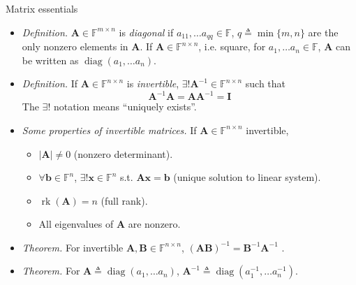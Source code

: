 \documentclass{beamer}
\numberwithin{equation}{section}
\begin{document}
\begin{frame}{Matrix essentials}
    \begin{itemize}
        \item
        \textit{Definition.} $ \mathbf{A} \in \mathbb{F}^{m \times n} $
        is \textit{diagonal} if $ a_{11}, \ldots a_{qq}  \in \mathbb{F} $,
        $ q \triangleq \min\{m, n\} $ are the only nonzero elements in
        $ \mathbf{A} $. If $ \mathbf{A} \in \mathbb{F}^{n \times n} $, i.e.
        square, for $ a_1, \ldots a_n \in \mathbb{F} $, $ \mathbf{A} $ can
        be written as $ \operatorname{diag}(a_1, \ldots a_n) $.
        
        \item
        \textit{Definition.} If $ \mathbf{A} \in \mathbb{F}^{n \times n} $ is
        \textit{invertible}, $ \exists! \mathbf{A}^{-1} \in
        \mathbb{F}^{n \times n} $ such that
        \begin{equation*}
            \mathbf{A}^{-1}\mathbf{A} = \mathbf{AA}^{-1} = \mathbf{I}
        \end{equation*}
        The $ \exists! $ notation means ``uniquely exists''.

        \item
        \textit{
            Some properties of invertible matrices\footnotemark{}.
        } If $ \mathbf{A} \in
        \mathbb{F}^{n \times n} $ invertible,
        \begin{itemize}
            \item
            $ |\mathbf{A}| \ne 0 $ (nonzero determinant).

            \item
            $ \forall \mathbf{b} \in \mathbb{F}^n $, $ \exists! \mathbf{x} \in
            \mathbb{F}^n $ s.t. $ \mathbf{Ax} = \mathbf{b} $ (unique solution
            to linear system).

            \item
            $ \operatorname{rk}(\mathbf{A}) = n $ (full rank).

            \item
            All eigenvalues of $ \mathbf{A} $ are nonzero.
        \end{itemize}

        \item
        \textit{Theorem.} For invertible $ \mathbf{A}, \mathbf{B} \in
        \mathbb{F}^{n \times n} $, $ (\mathbf{AB})^{-1} =
        \mathbf{B}^{-1}\mathbf{A}^{-1} $ \cite{jacob_linalg}.

        \item
        \textit{Theorem.} For $ \mathbf{A} \triangleq
        \operatorname{diag}(a_1, \ldots a_n) $, $ \mathbf{A}^{-1} \triangleq
        \operatorname{diag}\left(a_1^{-1}, \ldots a_n^{-1}\right) $.
    \end{itemize}

    \medskip
\end{frame}
\end{document}
